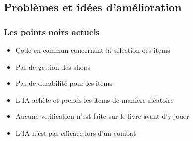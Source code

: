 \documentclass[beamer]{BetterDocument}
\begin{document}
	\subsection{Problèmes et idées d'amélioration}
	\begin{frame}
		\frametitle{Les points noirs actuels}

		\begin{itemize}
			\item{Code en commun concernant la sélection des items}
			\item{Pas de gestion des shops}
			\item{Pas de durabilité pour les items}
			\item{L'IA achète et prends les items de manière aléatoire}
			\item{Aucune verification n'est faite sur le livre avant d'y jouer}
			\item{L'IA n'est pas efficace lors d'un combat}
		\end{itemize}
	\end{frame}
\end{document}
